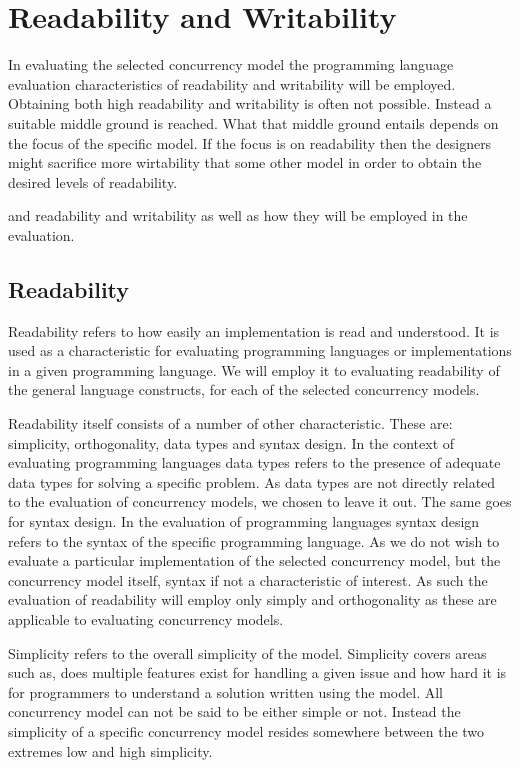 \section{Readability and Writability}
In evaluating the selected concurrency model the programming language evaluation characteristics of readability and writability will be employed. Obtaining both high readability and writability is often not possible. Instead a suitable middle ground is reached. What that middle ground entails depends on the focus of the specific model. If the focus is on readability then the designers might sacrifice more wirtability that some other model in order to obtain the desired levels of readability.

 and  readability and writability as well as how they will be employed in the evaluation.

\subsection{Readability}\label{sec:readability}
Readability refers to how easily an implementation is read and understood\cite[p. 8]{sebestaProLang}. It is used as a characteristic for evaluating programming languages or implementations in a given programming language. We will employ it to evaluating readability of the general language constructs, for each of the selected concurrency models.

Readability itself consists of a number of other characteristic. These are: simplicity, orthogonality, data types and syntax design. In the context of evaluating programming languages data types refers to the presence of adequate data types for solving a specific problem. As data types are not directly related to the evaluation of concurrency models, we chosen to leave it out. The same goes for syntax design. In the evaluation of programming languages syntax design refers to the syntax of the specific programming language. As we do not wish to evaluate a particular implementation of the selected concurrency model, but the concurrency model itself, syntax if not a characteristic of interest. As such the evaluation of readability will employ only simply and orthogonality  as these are applicable to evaluating concurrency models.

Simplicity refers to the overall simplicity of the model\cite[p. 8]{sebestaProLang}. Simplicity covers areas such as, does multiple features exist for handling a given issue and how hard it is for programmers to understand a solution written using the model. All concurrency model can not be said to be either simple or not. Instead the simplicity of a specific concurrency model resides somewhere between the two extremes low and high simplicity.  

